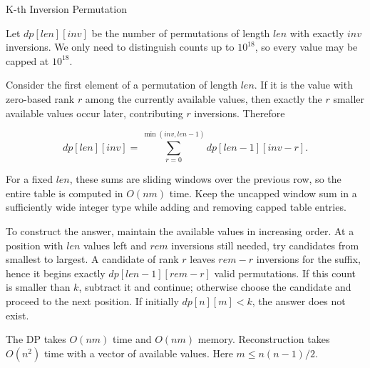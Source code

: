 \begin{tutorial}{K-th Inversion Permutation}

Let $dp[len][inv]$ be the number of permutations of length $len$ with exactly $inv$ inversions. We only need to distinguish counts up to $10^{18}$, so every value may be capped at $10^{18}$.

Consider the first element of a permutation of length $len$. If it is the value with zero-based rank $r$ among the currently available values, then exactly the $r$ smaller available values occur later, contributing $r$ inversions. Therefore

$$dp[len][inv] = \sum_{r=0}^{\min(inv,len-1)} dp[len-1][inv-r].$$

For a fixed $len$, these sums are sliding windows over the previous row, so the entire table is computed in $O(nm)$ time. Keep the uncapped window sum in a sufficiently wide integer type while adding and removing capped table entries.

To construct the answer, maintain the available values in increasing order. At a position with $len$ values left and $rem$ inversions still needed, try candidates from smallest to largest. A candidate of rank $r$ leaves $rem-r$ inversions for the suffix, hence it begins exactly $dp[len-1][rem-r]$ valid permutations. If this count is smaller than $k$, subtract it and continue; otherwise choose the candidate and proceed to the next position. If initially $dp[n][m] < k$, the answer does not exist.

The DP takes $O(nm)$ time and $O(nm)$ memory. Reconstruction takes $O(n^2)$ time with a vector of available values. Here $m \le n(n-1)/2$.


\end{tutorial}
